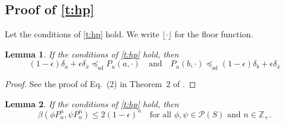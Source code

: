 \documentclass[12pt,reqno]{amsart}
\numberwithin{equation}{section}
\newtheorem{lemma}{Lemma}[section]
\theoremstyle{definition}
\newcommand{\1}{\mathbbm{1}}
\newcommand{\pP}{\mathscr{P}}
\newcommand{\precsd}{\preceq_{\textrm{sd}}}
\begin{document}
\subsection{Proof of \texorpdfstring{\cref{t:hp}}{Theorem \ref{t:hp}}}\label{ss:proofhp}

Let the conditions of \cref{t:hp} hold. We write $\lfloor \cdot \rfloor$
for the floor function.

\begin{lemma}\label{lem:bounds}
    If the conditions of \cref{t:hp} hold, then
    \begin{equation}
        (1-\epsilon)\delta_a + \epsilon \delta_{\bar{x}} \precsd P_u(a, \cdot)
        \quad \text{and} \quad
        P_u(b, \cdot) \precsd (1-\epsilon)\delta_b + \epsilon \delta_{\bar{x}}
    \end{equation}
\end{lemma}

\begin{proof}
    See the proof of Eq.~(2) in Theorem~2 of \cite{hopenhayn1992stochastic}.
\end{proof}


\begin{lemma}\label{lem:contraction}
    If the conditions of \cref{t:hp} hold, then
    \begin{equation}
        \beta(\phi P_u^n, \psi P_u^n) \leq 2(1-\epsilon)^n
        \quad \text{for all  $\phi, \psi \in \pP(S)$ and $n \in \mathbb{Z}_+$.}
    \end{equation}
\end{lemma}
\end{document}
